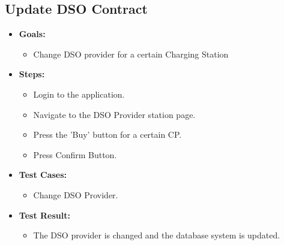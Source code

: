 \documentclass{Configuration_Files/PoliMi3i_thesis}
\begin{document}
\subsection{Update DSO Contract}
\begin{itemize}
    \item\textbf{Goals:}
        \begin{itemize}
            \item Change DSO provider for a certain Charging Station 
       \end{itemize}
    \item \textbf{Steps:}
        \begin{itemize}
            \item Login to the application.
            \item Navigate to the DSO Provider station page. 
            \item Press the 'Buy' button for a certain CP. 
            \item Press Confirm Button. 
        \end{itemize}
    \item \textbf{Test Cases:}
        \begin{itemize}
            \item Change DSO Provider. 
        \end{itemize}
    \item\textbf{Test Result:}
        \begin{itemize}
            \item The DSO provider is changed and the database system is updated.
        \end{itemize}
\end{itemize}
\end{document}
